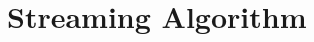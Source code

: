 \documentclass[11pt]{article}
\begin{document}
\section{Streaming Algorithm}\label{sec:streaming}


% 
% 

% 

% 

% 






\appendix 
\end{document}

